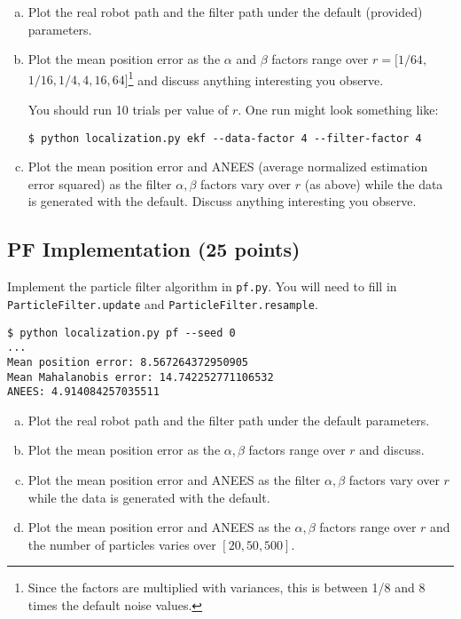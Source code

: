 \documentclass{article}
\newcommand{\?}{\stackrel{?}{=}}
\begin{document}
\begin{enumerate}[(a)]
\item Plot the real robot path and the filter path under the default (provided)
  parameters.
\item Plot the mean position error as the $\alpha$ and $\beta$ factors
  range over $r = [1/64,$ $1/16, 1/4, 4, 16, 64]$\footnote{
  Since the factors are multiplied with variances, this is between 1/8 and 8 times the default noise values.}
  and discuss anything interesting you observe.

  You should run 10 trials per value of $r$. One run might look something like:
\begin{verbatim}$ python localization.py ekf --data-factor 4 --filter-factor 4\end{verbatim}
\item Plot the mean position error and ANEES (average normalized estimation error squared)
  as the filter $\alpha, \beta$ factors vary over $r$ (as above) while the data is generated with the
  default. Discuss anything interesting you observe.
\end{enumerate}


\subsection{PF Implementation (25 points)}

Implement the particle filter algorithm in \texttt{pf.py}.
You will need to fill in \verb|ParticleFilter.update| and \verb|ParticleFilter.resample|.
\begin{verbatim}
$ python localization.py pf --seed 0
...
Mean position error: 8.567264372950905
Mean Mahalanobis error: 14.742252771106532
ANEES: 4.914084257035511
\end{verbatim}

\begin{enumerate}[(a)]
\item Plot the real robot path and the filter path under the default
  parameters.
\item Plot the mean position error as the $\alpha, \beta$ factors
  range over $r$ and discuss.
\item Plot the mean position error and ANEES as the filter $\alpha, \beta$ factors
  vary over $r$ while the data is generated with the default.
\item Plot the mean position error and ANEES as the $\alpha, \beta$ factors
  range over $r$ and the number of particles varies over $[20, 50, 500]$.
\end{enumerate}
\end{document}
